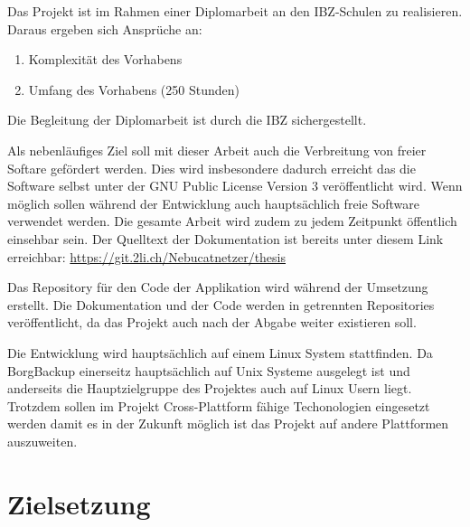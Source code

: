 \documentclass[a4paper,11pt]{article}
\begin{document}
Das Projekt ist im Rahmen einer Diplomarbeit an den IBZ-Schulen zu
realisieren. Daraus ergeben sich Ansprüche an:

\begin{enumerate}
\item Komplexität des Vorhabens
\item Umfang des Vorhabens (250 Stunden)
\end{enumerate}

Die Begleitung der Diplomarbeit ist durch die IBZ sichergestellt.

Als nebenläufiges Ziel soll mit dieser Arbeit auch die Verbreitung von
freier Softare gefördert werden. Dies wird insbesondere dadurch
erreicht das die Software selbst unter der GNU Public License Version
3 veröffentlicht wird. Wenn möglich sollen während der Entwicklung
auch hauptsächlich freie Software verwendet werden. Die gesamte Arbeit
wird zudem zu jedem Zeitpunkt öffentlich einsehbar sein. Der Quelltext
der Dokumentation ist bereits unter diesem Link erreichbar:
\url{https://git.2li.ch/Nebucatnetzer/thesis}

Das Repository für den Code der Applikation wird während der Umsetzung
erstellt. Die Dokumentation und der Code werden in getrennten
Repositories veröffentlicht, da das Projekt auch nach der Abgabe
weiter existieren soll.

Die Entwicklung wird hauptsächlich auf einem Linux System stattfinden.
Da BorgBackup einerseitz hauptsächlich auf Unix Systeme ausgelegt ist
und anderseits die Hauptzielgruppe des Projektes auch auf Linux Usern
liegt. Trotzdem sollen im Projekt Cross-Plattform fähige Techonologien
eingesetzt werden damit es in der Zukunft möglich ist das Projekt auf
andere Plattformen auszuweiten.

\section{Zielsetzung}
\label{sec:orgea12289}
\end{document}
